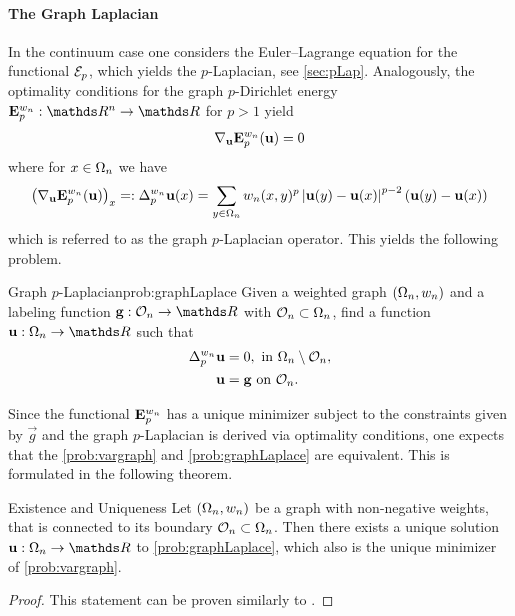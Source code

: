 \paragraph{The Graph Laplacian}
%
In the continuum case one considers the Euler--Lagrange equation for the functional $\mathcal{E}_p$, which yields the 
$p$-Laplacian, see \cref{sec:pLap}. Analogously, the optimality conditions for the graph $p$-Dirichlet energy $\GE^{w_n}_p:\R^n\to\R$ for $p > 1$ yield
%
\begin{align*}
\nabla_{\mathbf{u}} \mathbf{E}^{w_n}_p(\mathbf{u}) = 0
\end{align*}
%
where for $x\in\Omega_n$ we have 
\begin{align*}
\left(\nabla_{\mathbf{u}} \mathbf{E}^{w_n}_p(\mathbf{u})\right)_x =:\Delta^{w_n}_p \mathbf{u}(x)= \sum_{y\in\Omega_n} w_n(x,y)^p \left|\mathbf{u}(y) - \mathbf{u}(x)\right|^{p-2} \left( \mathbf{u}(y) - \mathbf{u}(x) \right)
\end{align*}
%
which is referred to as the graph $p$-Laplacian operator. This yields the following problem.
%
\begin{problem}{Graph $p$-Laplacian}{prob:graphLaplace}
	Given a weighted graph $(\Omega_n, w_n)$ and a labeling function $\vec g:\conset_n\to\R$ with $\mathcal{O}_n\subset\Omega_n$, find 
	a function $\vec u:\domain_n\to\R$ such that
	\begin{align*}
		\Delta_p^{w_n} \mathbf{u} &= 0, \text{ in } \Omega_n\setminus \mathcal{O}_n,\\
		\mathbf{u} &= \mathbf{g} \text{ on } \mathcal{O}_n.
	\end{align*}
\end{problem}
%
\noindent%
Since the functional $\mathbf{E}^{w_n}_p$ has a unique minimizer subject to the constraints given by $\vec g$ and the graph $p$-Laplacian is derived 
via optimality conditions, one expects that the \cref{prob:vargraph} and \cref{prob:graphLaplace} are equivalent. This is formulated in the following 
theorem.
%
\begin{theorem}{Existence and Uniqueness}{}
Let $(\Omega_n,w_n)$ be a graph with non-negative weights, that is connected to its boundary $\mathcal{O}_n\subset\Omega_n$. Then there exists a unique solution $\vec u:\domain_n\to\R$ to \cref{prob:graphLaplace}, which also is the unique minimizer of \cref{prob:vargraph}.
\end{theorem}
%
\begin{proof}
This statement can be proven similarly to \cite[Theorem 5.3]{elmoataz2015p}.
\end{proof}
%
%
%
%
%

